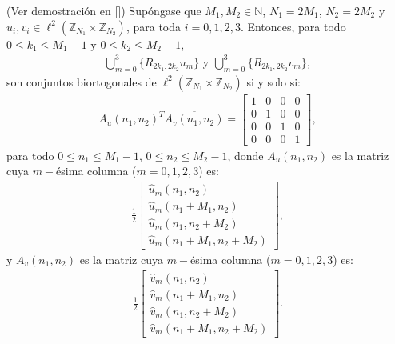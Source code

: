 \begin{theorem}
(Ver demostraci\'on en [\textcolor{cyan}{\cite{12}}]) Sup\'ongase que $M_1,M_2\in\mathbb{N}$, $N_1=2M_1$, $N_2=2M_2$ y $u_i,v_i\in \ell^2(\mathbb{Z}_{N_1}\times\mathbb{Z}_{N_2})$, para toda $i=0,1,2,3$. Entonces, para todo\linebreak $0\leq k_1 \leq M_1-1$ y $0\leq k_2 \leq M_2-1$,
\begin{eqnarray}
\bigcup_{m=0}^{3}\{R_{2k_1,2k_2}u_m\}\mbox{ y }\bigcup_{m=0}^{3}\{R_{2k_1,2k_2}v_m\},\nonumber
\end{eqnarray}
son conjuntos biortogonales de $\ell^2(\mathbb{Z}_{N_1}\times\mathbb{Z}_{N_2})$ si y solo si:
\begin{eqnarray}
A_u(n_1,n_2)^T\overline{A_v(n_1,n_2)}=\left[\begin{array}{cccc}
1&0&0&0\\0&1&0&0\\0&0&1&0\\0&0&0&1
\end{array}\right],\nonumber
\end{eqnarray}
para todo $0\leq n_1 \leq M_1-1$, $0\leq n_2 \leq M_2-1$, donde $A_u(n_1,n_2)$ es la matriz cuya $m-$\'esima columna ($m=0,1,2,3$) es:
\begin{eqnarray}
\frac{1}{2}\left[\begin{array}{c}
\hat{u}_m(n_1,n_2)\\
\hat{u}_m(n_1+M_1,n_2)\\
\hat{u}_m(n_1,n_2+M_2)\\
\hat{u}_m(n_1+M_1,n_2+M_2)
\end{array}\right],\nonumber
\end{eqnarray}
y $A_v(n_1,n_2)$ es la matriz cuya $m-$\'esima columna ($m=0,1,2,3$) es:
\begin{eqnarray}
\frac{1}{2}\left[\begin{array}{c}
\hat{v}_m(n_1,n_2)\\
\hat{v}_m(n_1+M_1,n_2)\\
\hat{v}_m(n_1,n_2+M_2)\\
\hat{v}_m(n_1+M_1,n_2+M_2)
\end{array}\right].\nonumber
\end{eqnarray}
\label{biortogonalidad}
\end{theorem}

